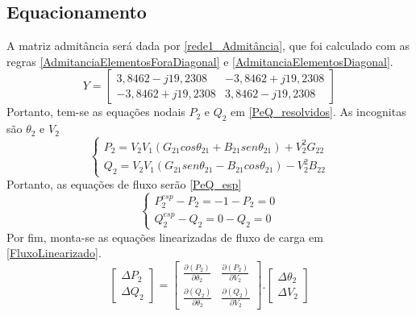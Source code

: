 \subsection{Equacionamento}
A matriz admitância será dada por \ref{rede1_Admitância}, que foi calculado com as regras \ref{AdmitanciaElementosForaDiagonal} e \ref{AdmitanciaElementosDiagonal}.
\begin{equation}
   Y = \left[ 
    \begin{matrix} 
        3,8462-j19,2308 & -3,8462+j19,2308  \\ 
        -3,8462+j19,2308 & 3,8462-j19,2308  
    \end{matrix} \right] 
    \label{rede1_Admitância}
\end{equation}
Portanto, tem-se as equações nodais $P_2$ e $Q_2$ em \ref{PeQ_resolvidos}. As incognitas são $\theta_2$ e $V_2$
\begin{equation}
    \left\{    \begin{array}{lll}
                P_2= V_2V_1(G_{21}cos \theta_{21}+ B_{21}sen \theta_{21}) + V^2_2G_{22}\\
                Q_2= V_2V_1(G_{21}sen \theta_{21}- B_{21}cos \theta_{21}) - V^2_2B_{22}
            \end{array}\right.
    \label{PeQ_resolvidos}
\end{equation}
Portanto, as equações de fluxo serão \ref{PeQ_esp}
\begin{equation}
    \left\{    \begin{array}{lll}
                P^{esp}_2-P_2 = -1-P_2=0\\
                Q^{esp}_2-Q_2 = 0-Q_2=0
            \end{array}\right.
    \label{PeQ_esp}
\end{equation}
Por fim, monta-se as equações linearizadas de fluxo de carga em \ref{FluxoLinearizado}.
\begin{equation}
   \left[ \begin{matrix} \Delta P_2 \\ \Delta Q_2  \end{matrix} \right] =  \left[ \begin{matrix} \frac{\partial (P_2)}{\partial \theta_2} & \frac{\partial (P_2)}{\partial V_2}  \\ \frac{\partial (Q_2)}{\partial \theta_2} & \frac{\partial (Q_2)}{\partial V_2} \end{matrix} \right] .  \left[ \begin{matrix} \Delta \theta_2 \\ \Delta V_2  \end{matrix} \right]
    \label{FluxoLinearizado}
\end{equation}
